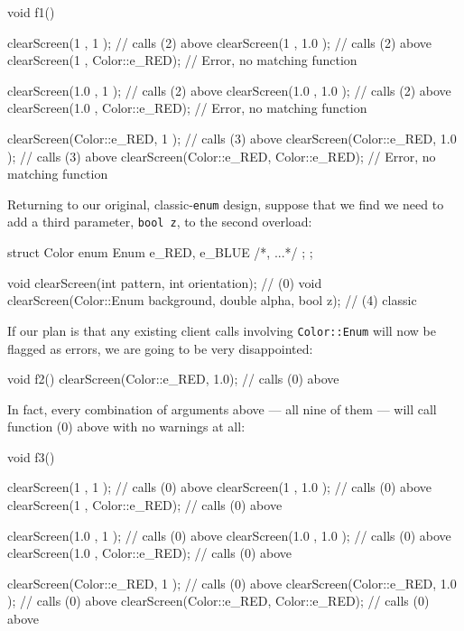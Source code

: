 \begin{emcppslisting}[emcppsbatch=e8]
void f1()
{
    clearScreen(1           , 1           );  // calls (2) above
    clearScreen(1           , 1.0         );  // calls (2) above
    clearScreen(1           , Color::e_RED);  // Error, no matching function

    clearScreen(1.0         , 1           );  // calls (2) above
    clearScreen(1.0         , 1.0         );  // calls (2) above
    clearScreen(1.0         , Color::e_RED);  // Error, no matching function

    clearScreen(Color::e_RED, 1           );  // calls (3) above
    clearScreen(Color::e_RED, 1.0         );  // calls (3) above
    clearScreen(Color::e_RED, Color::e_RED);  // Error, no matching function
}
\end{emcppslisting}

\noindent Returning to our original, classic-\texttt{enum} design, suppose that we
find we need to add a third parameter, \texttt{bool}~\texttt{z}, to the
second overload:

\begin{emcppshiddenlisting}[emcppsbatch=e9]
struct Color
{
    enum Enum { e_RED, e_BLUE /*, ...*/ };
};
\end{emcppshiddenlisting}
\begin{emcppslisting}[emcppsbatch=e9]
void clearScreen(int pattern, int orientation);                  // (0)
void clearScreen(Color::Enum background, double alpha, bool z);  // (4) classic
\end{emcppslisting}

\noindent If our plan is that any existing client calls involving
\texttt{Color::Enum} will now be flagged as errors, we are going to be
very disappointed:

\begin{emcppslisting}[emcppsbatch=e9]
void f2()
{
    clearScreen(Color::e_RED, 1.0);  // calls (0) above
}
\end{emcppslisting}

\noindent In fact, every combination of arguments above --- all nine of them ---
will call function (0) above with no warnings at all:

\begin{emcppslisting}[emcppsbatch=e9]
void f3()
{
    clearScreen(1           , 1           );  // calls (0) above
    clearScreen(1           , 1.0         );  // calls (0) above
    clearScreen(1           , Color::e_RED);  // calls (0) above

    clearScreen(1.0         , 1           );  // calls (0) above
    clearScreen(1.0         , 1.0         );  // calls (0) above
    clearScreen(1.0         , Color::e_RED);  // calls (0) above

    clearScreen(Color::e_RED, 1           );  // calls (0) above
    clearScreen(Color::e_RED, 1.0         );  // calls (0) above
    clearScreen(Color::e_RED, Color::e_RED);  // calls (0) above
}
\end{emcppslisting}

